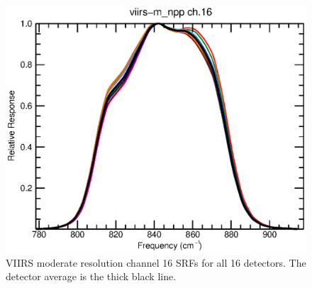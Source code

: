 \begin{figure}[H]
  \centering
  \includegraphics[bb= 0 15 400 330,clip,scale=0.8]{graphics/srfs/viirs-m_npp-16.eps}
  \caption{VIIRS moderate resolution channel 16 SRFs for all 16 detectors. The detector average is the thick black line.}
  \label{fig:viirs-m_npp-16}
\end{figure}


\newpage
